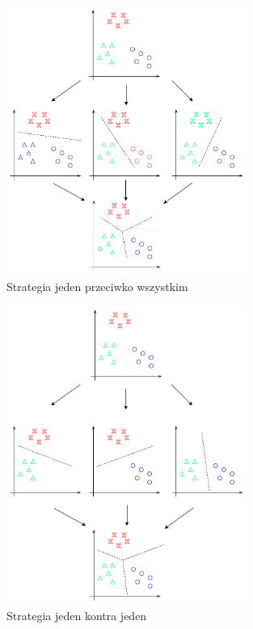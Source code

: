 \begin{figure}[H]
    \centering
    \includegraphics[width=0.7\textwidth]{images/ovr}
    \caption{ Strategia jeden przeciwko wszystkim }
    \customsource
    \label{fig:ovr}
\end{figure}

\begin{figure}[PH]
    \centering
    \includegraphics[width=0.7\textwidth]{images/ovo}
    \caption{ Strategia jeden kontra jeden }
    \customsource
    \label{fig:ovo}
\end{figure}

